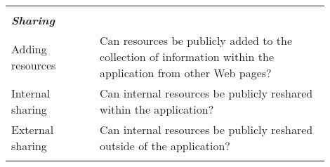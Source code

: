 \begin{table*}[htbp]
\begin{tabular}{|p{0.25\linewidth}|p{0.65\linewidth}|}
 &\\      
\emph{\textbf{Sharing}}            &                                                                                                           \\
Adding resources             & Can resources be publicly added to the collection of information within the application from other Web pages?     \\
Internal sharing         & Can internal resources be publicly reshared within the application?         \\ 
External sharing          & Can internal resources be publicly reshared outside of the application?         \\ 
&\\         
\hline
\end{tabular}
\end{table*}





